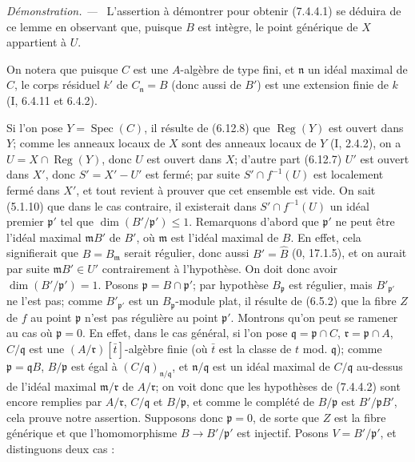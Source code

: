 \documentclass[10pt,oneside]{book}
\newenvironment{proof}{%
  \par\medskip\noindent\textit{Démonstration. ---\ }}{\par}
\begin{document}
\begin{proof}
L'assertion à démontrer pour obtenir (7.4.4.1) se déduira de ce lemme en
observant que, puisque $B$ est intègre, le point générique de $X$ appartient
à $U$.

On notera que puisque $C$ est une $A$-algèbre de type fini, et $\mathfrak n$
un idéal maximal de $C$, le corps résiduel $k'$ de
$C_{\mathfrak n}=B$ (donc aussi de $B'$) est une extension finie de $k$
(I, 6.4.11 et 6.4.2).

Si l'on pose $Y=\operatorname{Spec}(C)$, il résulte de (6.12.8) que
$\operatorname{Reg}(Y)$ est ouvert dans $Y$; comme les anneaux locaux de
$X$ sont des anneaux locaux de $Y$ (I, 2.4.2), on a
$U=X\cap\operatorname{Reg}(Y)$, donc $U$ est ouvert dans $X$; d'autre part
(6.12.7) $U'$ est ouvert dans $X'$, donc $S'=X'-U'$ est fermé; par suite
$S'\cap f^{-1}(U)$ est localement fermé dans $X'$, et tout revient à
prouver que cet ensemble est vide. On sait (5.1.10) que dans le cas
contraire, il existerait dans $S'\cap f^{-1}(U)$ un idéal premier
$\mathfrak p'$ tel que $\dim(B'/\mathfrak p')\leqslant1$. Remarquons d'abord
que $\mathfrak p'$ ne peut être l'idéal maximal $\mathfrak mB'$ de $B'$,
où $\mathfrak m$ est l'idéal maximal de $B$. En effet, cela signifierait que
$B=B_{\mathfrak m}$ serait régulier, donc aussi $B'=\widehat B$ (0,
17.1.5), et on aurait par suite $\mathfrak mB'\in U'$ contrairement à
l'hypothèse. On doit donc avoir $\dim(B'/\mathfrak p')=1$. Posons
$\mathfrak p=B\cap\mathfrak p'$; par hypothèse $B_{\mathfrak p}$ est
régulier, mais $B'_{\mathfrak p'}$ ne l'est pas; comme
$B'_{\mathfrak p'}$ est un $B_{\mathfrak p}$-module plat, il résulte de
(6.5.2) que la fibre $Z$ de $f$ au point $\mathfrak p$ n'est pas régulière
au point $\mathfrak p'$. Montrons qu'on peut se ramener au cas où
$\mathfrak p=0$. En effet, dans le cas général, si l'on pose
$\mathfrak q=\mathfrak p\cap C$, $\mathfrak r=\mathfrak p\cap A$,
$C/\mathfrak q$ est une $(A/\mathfrak r)[\bar t]$-algèbre finie (où
$\bar t$ est la classe de $t$ mod. $\mathfrak q$); comme
$\mathfrak p=\mathfrak qB$, $B/\mathfrak p$ est égal à
$(C/\mathfrak q)_{\mathfrak n/\mathfrak q}$, et
$\mathfrak n/\mathfrak q$ est un idéal maximal de $C/\mathfrak q$
au-dessus de l'idéal maximal $\mathfrak m/\mathfrak r$ de
$A/\mathfrak r$; on voit donc que les hypothèses de (7.4.4.2) sont encore
remplies par $A/\mathfrak r$, $C/\mathfrak q$ et $B/\mathfrak p$, et comme
le complété de $B/\mathfrak p$ est $B'/\mathfrak pB'$, cela prouve notre
assertion. Supposons donc $\mathfrak p=0$, de sorte que $Z$ est la fibre
générique et que l'homomorphisme $B\to B'/\mathfrak p'$ est injectif.
Posons $V=B'/\mathfrak p'$, et distinguons deux cas :


\end{proof}
\end{document}

